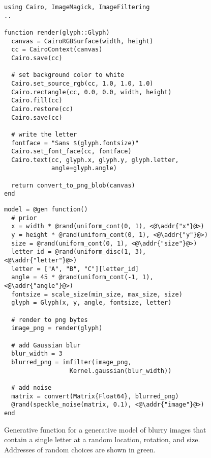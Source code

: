 \begin{figure}[t]
\begin{minipage}[t]{0.5\textwidth}
\begin{lstlisting}
using Cairo, ImageMagick, ImageFiltering
..

function render(glyph::Glyph)
  canvas = CairoRGBSurface(width, height)
  cc = CairoContext(canvas)
  Cairo.save(cc)

  # set background color to white
  Cairo.set_source_rgb(cc, 1.0, 1.0, 1.0)
  Cairo.rectangle(cc, 0.0, 0.0, width, height)
  Cairo.fill(cc)
  Cairo.restore(cc)
  Cairo.save(cc)

  # write the letter
  fontface = "Sans $(glyph.fontsize)"
  Cairo.set_font_face(cc, fontface)
  Cairo.text(cc, glyph.x, glyph.y, glyph.letter,
             angle=glyph.angle)

  return convert_to_png_blob(canvas)
end
\end{lstlisting}
\end{minipage}%
\begin{minipage}[t]{0.5\textwidth}
\begin{lstlisting}
model = @gen function()
  # prior
  x = width * @rand(uniform_cont(0, 1), <@\addr{"x"}@>)
  y = height * @rand(uniform_cont(0, 1), <@\addr{"y"}@>)
  size = @rand(uniform_cont(0, 1), <@\addr{"size"}@>)
  letter_id = @rand(uniform_disc(1, 3), <@\addr{"letter"}@>)
  letter = ["A", "B", "C"][letter_id]
  angle = 45 * @rand(uniform_cont(-1, 1), <@\addr{"angle"}@>)
  fontsize = scale_size(min_size, max_size, size)
  glyph = Glyph(x, y, angle, fontsize, letter)

  # render to png bytes
  image_png = render(glyph)

  # add Gaussian blur
  blur_width = 3
  blurred_png = imfilter(image_png,
                  Kernel.gaussian(blur_width))

  # add noise
  matrix = convert(Matrix{Float64}, blurred_png)
  @rand(speckle_noise(matrix, 0.1), <@\addr{"image"}@>)
end
\end{lstlisting}
\end{minipage}
\caption{Generative function for a generative model of blurry images that contain a single letter at a random location, rotation, and size. Addresses of random choices are shown in green.}
\label{fig:model-code-figure}
\end{figure}
